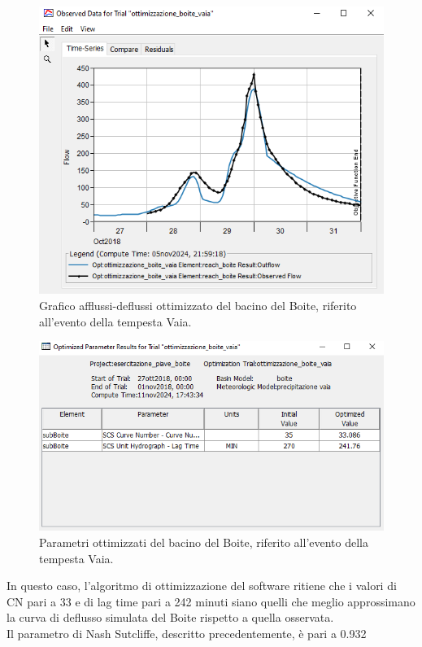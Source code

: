 \begin{figure}[H]\centering
\includegraphics[scale=1]{immagini/ottim_boite.PNG}
\caption{Grafico afflussi-deflussi ottimizzato del bacino del Boite, riferito all'evento della tempesta Vaia.}
    \label{ottim_boite}    
\end{figure}

\begin{figure}[H]\centering
    \includegraphics[scale=1]{immagini/par_ottimiz_boite.PNG}
    \caption{Parametri ottimizzati del bacino del Boite, riferito all'evento della tempesta Vaia.}
        \label{par_ottim_boite}    
    \end{figure}

In questo caso, l'algoritmo di ottimizzazione del software ritiene che i valori di CN pari a 33 e di lag time pari a 242 minuti siano quelli che meglio approssimano la curva di deflusso simulata del Boite rispetto a quella osservata.\\
Il parametro di Nash Sutcliffe, descritto precedentemente, è pari a 0.932

